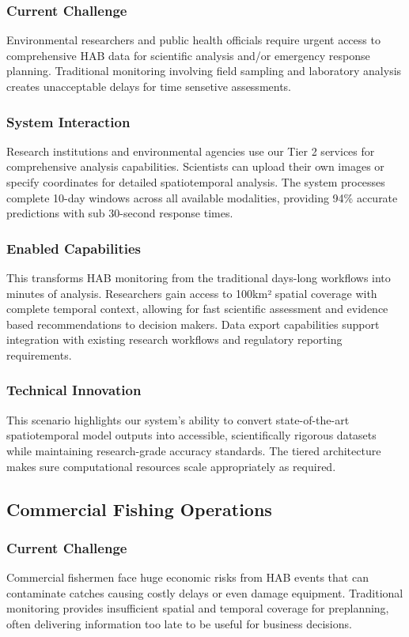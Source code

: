 \documentclass[conference]{IEEEtran}
\begin{document}
\subsubsection{Current Challenge}
Environmental researchers and public health officials require urgent access to comprehensive HAB data for scientific analysis and/or emergency response planning. Traditional monitoring involving field sampling and laboratory analysis creates unacceptable delays for time sensetive assessments.
\subsubsection{System Interaction}
Research institutions and environmental agencies use our Tier 2 services for comprehensive analysis capabilities. Scientists can upload their own images or specify coordinates for detailed spatiotemporal analysis. The system processes complete 10-day windows across all available modalities, providing 94\% accurate predictions with sub 30-second response times.
\subsubsection{Enabled Capabilities}
This transforms HAB monitoring from the traditional days-long workflows into minutes of analysis. Researchers gain access to 100km² spatial coverage with complete temporal context, allowing for fast scientific assessment and evidence based recommendations to decision makers. Data export capabilities support integration with existing research workflows and regulatory reporting requirements.
\subsubsection{Technical Innovation}
This scenario highlights our system's ability to convert state-of-the-art spatiotemporal model outputs into accessible, scientifically rigorous datasets while maintaining research-grade accuracy standards. The tiered architecture makes sure computational resources scale appropriately as required.


\subsection{Commercial Fishing Operations}
\subsubsection{Current Challenge}
Commercial fishermen face huge economic risks from HAB events that can contaminate catches causing costly delays or even damage equipment. Traditional monitoring provides insufficient spatial and temporal coverage for preplanning, often delivering information too late to be useful for business decisions.
\end{document}
